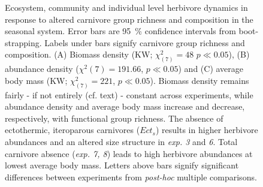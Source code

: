 \begin{figure}
\centering

\caption[Ecosystem, community and individual level response to altered carnivore group richness and composition in the seasonal system]{Ecosystem, community and individual level herbivore dynamics in response to altered carnivore group richness and composition in the seasonal system. Error bars are 95~\% confidence intervals from boot-strapping. Labels under bars signify carnivore group richness and composition. (A) Biomass density (KW; $\chi^{2}_{(7)} = 48$ $p \ll 0.05$), (B) abundance density ($\chi^{2}(7) = 191.66$, $p \ll 0.05$) and (C) average body mass (KW; $\chi^{2}_{(7)} = 221$, $p \ll 0.05$). Biomass density remains fairly - if not entirely (cf. text) - constant across experiments, while abundance density and average body mass increase and decrease, respectively, with functional group richness. The absence of ectothermic, iteroparous carnivores ($Ect_s$) results in higher herbivore abundances and an altered size structure in \textit{exp. 3} and \textit{6}. Total carnivore absence (\textit{exp. 7, 8}) leads to high herbivore abundances at lowest average body mass. Letters above bars signify significant differences between experiments from \textit{post-hoc} multiple comparisons.}
\label{fig:chap:res:dyn:cell1}
\end{figure}




%
